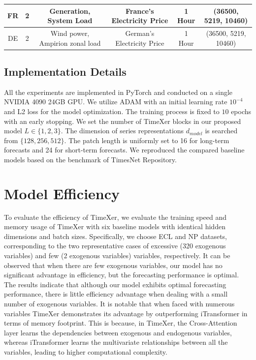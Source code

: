 \documentclass[nohyperref]{article}
\theoremstyle{plain}
\theoremstyle{definition}
\theoremstyle{remark}
\begin{document}
\begin{table}[h]
{\begin{tabular}{cccccc}
FR                   & 2                  & Generation, System Load                          & France's Electricity Price       & 1 Hour    & (36500, 5219, 10460)                  \\ \midrule
DE                   & 2                  & Wind power, Ampirion zonal load                  & German's Electricity Price       & 1 Hour    & (36500, 5219, 10460)                  \\ \bottomrule[1.2pt]
\end{tabular}}
\label{tab:full-dataset}
\vspace{-10pt}
\end{table}
\subsection{Implementation Details}

All the experiments are implemented in PyTorch \cite{paszke2019pytorch} and conducted on a single NVIDIA 4090 24GB GPU. We utilize ADAM \cite{kingma2014adam} with an initial learning rate $10^{-4}$ and L2 loss for the model optimization. The training process is fixed to $10$ epochs with an early stopping. We set the number of TimeXer blocks in our proposed model $L\in\{1, 2, 3\}$. The dimension of series representations $d_{model}$ is searched from $\{128, 256, 512\}$. The patch length is uniformly set to 16 for long-term forecasts and 24 for short-term forecasts. We reproduced the compared baseline models based on the benchmark of TimesNet \cite{wu2023timesnet} Repository.

\section{Model Efficiency}
To evaluate the efficiency of TimeXer, we evaluate the training speed and memory usage of TimeXer with six baseline models with identical hidden dimensions and batch sizes. Specifically, we choose ECL and NP datasets, corresponding to the two representative cases of excessive (320 exogenous variables) and few (2 exogenous variables) variables, respectively. It can be observed that when there are few exogenous variables, our model has no significant advantage in efficiency, but the forecasting performance is optimal. The results indicate that although our model exhibits optimal forecasting performance, there is little efficiency advantage when dealing with a small number of exogenous variables.
It is notable that when faced with numerous variables TimeXer demonstrates its advantage by outperforming iTransformer in terms of memory footprint. This is because, in TimeXer, the Cross-Attention layer learns the dependencies between exogenous and endogenous variables, whereas iTransformer learns the multivariate relationships between all the variables, leading to higher computational complexity.
\end{document}
